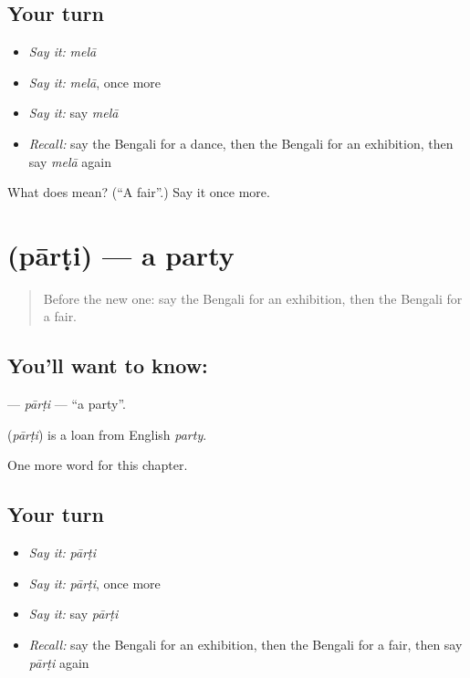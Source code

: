\subsection*{Your turn}
\begin{itemize}
\raggedright
  \item \emph{Say it:} \emph{melā}
  \item \emph{Say it:} \emph{melā}, once more
  \item \emph{Say it:} say \emph{melā}
  \item \emph{Recall:} say the Bengali for a dance, then the Bengali for an exhibition, then say \emph{melā} again
\end{itemize}

\begin{tcolorbox}[breakable,colback=teal!4,colframe=teal!35!black,title={Before you move on}]
What does  mean? (\textquotedblleft{}A fair\textquotedblright{}.) Say it once more.
\end{tcolorbox}
\section[\texorpdfstring{\bn{পার্টি} (pārṭi)}{পার্টি (pārṭi)}]{ (pārṭi) — a party}

\label{lesson:BN-C251-parti}



\begin{quote}
Before the new one: say the Bengali for an exhibition, then the Bengali for a fair.
\end{quote}

\subsection*{You'll want to know: }
\textbf{} — \emph{pārṭi} — \textquotedblleft{}a party\textquotedblright{}.

\begin{cousinweb}
\textbf{} (\emph{pārṭi}) is a loan from English \emph{party}.
\end{cousinweb}

\begin{grammarlens}[title={What you've built}]
One more word for this chapter.
\end{grammarlens}

\subsection*{Your turn}
\begin{itemize}
\raggedright
  \item \emph{Say it:} \emph{pārṭi}
  \item \emph{Say it:} \emph{pārṭi}, once more
  \item \emph{Say it:} say \emph{pārṭi}
  \item \emph{Recall:} say the Bengali for an exhibition, then the Bengali for a fair, then say \emph{pārṭi} again
\end{itemize}

